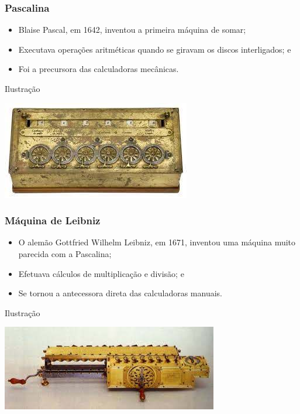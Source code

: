 \documentclass[aspectratio=169]{beamer} %
\begin{document}
\begin{frame}
	\frametitle{Pascalina}
	
	\begin{itemize}
		\item Blaise Pascal, em 1642, inventou a primeira máquina de somar;
		\item Executava operações aritméticas quando se giravam os discos interligados; e
		\item Foi a precursora das calculadoras mecânicas.
	\end{itemize}\vfill
	
	\begin{exampleblock}{Ilustra\c cão}
		\begin{center}
			\includegraphics[scale=0.5]{img/pascalina}
		\end{center}
	\end{exampleblock}
\end{frame}

\begin{frame}
	\frametitle{Máquina de Leibniz}
	
	\begin{itemize}
		\item O alemão Gottfried Wilhelm Leibniz, em 1671, inventou uma máquina muito parecida com a Pascalina;
		\item Efetuava cálculos de multiplicação e divisão; e
		\item Se tornou a antecessora direta das calculadoras manuais.
	\end{itemize}\vfill
	
	\begin{exampleblock}{Ilustra\c cão}
		\begin{center}
			\includegraphics[scale=0.5]{img/maquina_leibniz}
		\end{center}
	\end{exampleblock}
\end{frame}
\end{document}
